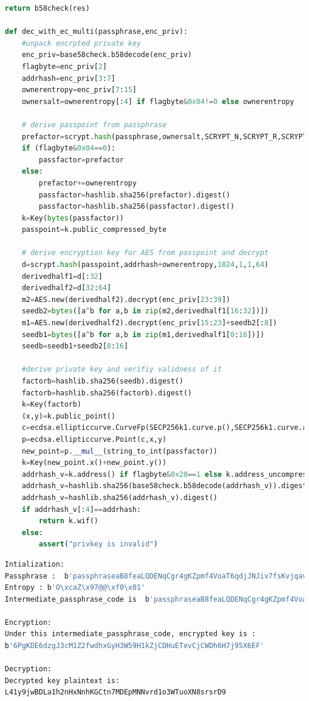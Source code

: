 \begin{lstlisting}[language=python, caption = 使用EC乘法的加解密过程示例, label=lst-m2]
	return b58check(res)

def dec_with_ec_multi(passphrase,enc_priv):
	#unpack encrpted private key
	enc_priv=base58check.b58decode(enc_priv)
	flagbyte=enc_priv[2]
	addrhash=enc_priv[3:7]
	ownerentropy=enc_priv[7:15]
	ownersalt=ownerentropy[:4] if flagbyte&0x04!=0 else ownerentropy
		
	# derive passpoint from passphrase
	prefactor=scrypt.hash(passphrase,ownersalt,SCRYPT_N,SCRYPT_R,SCRYPT_P,32)
	if (flagbyte&0x04==0):
		passfactor=prefactor
	else:			
		prefactor+=ownerentropy
		passfactor=hashlib.sha256(prefactor).digest()
		passfactor=hashlib.sha256(passfactor).digest()
	k=Key(bytes(passfactor))
	passpoint=k.public_compressed_byte

	# derive encryption key for AES from passpoint and decrypt
	d=scrypt.hash(passpoint,addrhash+ownerentropy,1024,1,1,64)
	derivedhalf1=d[:32]
	derivedhalf2=d[32:64]
	m2=AES.new(derivedhalf2).decrypt(enc_priv[23:39])
	seedb2=bytes([a^b for a,b in zip(m2,derivedhalf1[16:32])])
	m1=AES.new(derivedhalf2).decrypt(enc_priv[15:23]+seedb2[:8])
	seedb1=bytes([a^b for a,b in zip(m1,derivedhalf1[0:16])])
	seedb=seedb1+seedb2[8:16]

	#derive private key and verifiy validness of it
	factorb=hashlib.sha256(seedb).digest()
	factorb=hashlib.sha256(factorb).digest()
	k=Key(factorb)
	(x,y)=k.public_point()
	c=ecdsa.ellipticcurve.CurveFp(SECP256k1.curve.p(),SECP256k1.curve.a(),SECP256k1.curve.b())
	p=ecdsa.ellipticcurve.Point(c,x,y)
	new_point=p.__mul__(string_to_int(passfactor))
	k=Key(new_point.x()+new_point.y())
	addrhash_v=k.address() if flagbyte&0x20==1 else k.address_uncompressed()
	addrhash_v=hashlib.sha256(base58check.b58decode(addrhash_v)).digest()
	addrhash_v=hashlib.sha256(addrhash_v).digest()
	if addrhash_v[:4]==addrhash:
		return k.wif()
	else:
		assert("privkey is invalid")
\end{lstlisting}


\begin{lstlisting}[language=bash, caption = Listing~\ref{lst-m2}~的执行结果示例, label=lst-m2res]
Intialization:
Passphrase :  b'passphraseaB8feaLQDENqCgr4gKZpmf4VoaT6qdjJNJiv7fsKvjqavcJxvuR1hy25aTu5sX'
Entropy : b'O\xcaZ\x97@@\xf0\x01'
Intermediate_passphrase_code is  b'passphraseaB8feaLQDENqCgr4gKZpmf4VoaT6qdjJNJiv7fsKvjqavcJxvuR1hy25aTu5sX'

Encryption:
Under this intermediate_passphrase_code, encrypted key is :
b'6PgKDE6dzgJ3cM1Z2fwdhxGyH3W59H1kZjCDHuETevCjCWDh6H7j95X6EF'

Decryption:
Decrypted key plaintext is:
L41y9jwBDLa1h2nHxNnhKGCtn7MDEpMNNvrd1o3WTuoXN8srsrD9
\end{lstlisting}

